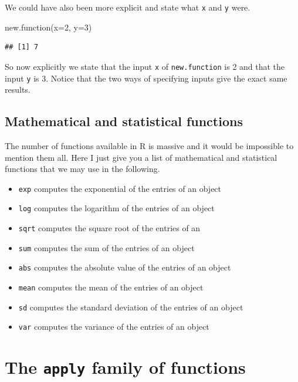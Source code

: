 \documentclass[
]{book}
\newenvironment{Shaded}{\begin{snugshade}}{\end{snugshade}}
\newcommand{\AttributeTok}[1]{\textcolor[rgb]{0.77,0.63,0.00}{#1}}
\newcommand{\DecValTok}[1]{\textcolor[rgb]{0.00,0.00,0.81}{#1}}
\newcommand{\FunctionTok}[1]{\textcolor[rgb]{0.00,0.00,0.00}{#1}}
\newcommand{\NormalTok}[1]{#1}
\begin{document}
We could have also been more explicit and state what \texttt{x} and \texttt{y} were.

\begin{Shaded}
\begin{Highlighting}[]
\FunctionTok{new.function}\NormalTok{(}\AttributeTok{x=}\DecValTok{2}\NormalTok{, }\AttributeTok{y=}\DecValTok{3}\NormalTok{)}
\end{Highlighting}
\end{Shaded}

\begin{verbatim}
## [1] 7
\end{verbatim}

So now explicitly we state that the input \texttt{x} of \texttt{new.function} is 2 and that the input \texttt{y} is 3. Notice that the two ways of specifying inputs give the exact same results.

\hypertarget{mathematical-and-statistical-functions}{%
\subsection{Mathematical and statistical functions}\label{mathematical-and-statistical-functions}}

The number of functions available in R is massive and it would be impossible to mention them all. Here I just give you a list of mathematical and statistical functions that we may use in the following.

\begin{itemize}
\item
  \texttt{exp} computes the exponential of the entries of an object
\item
  \texttt{log} computes the logarithm of the entries of an object
\item
  \texttt{sqrt} computes the square root of the entries of an
\item
  \texttt{sum} computes the sum of the entries of an object
\item
  \texttt{abs} computes the absolute value of the entries of an object
\item
  \texttt{mean} computes the mean of the entries of an object
\item
  \texttt{sd} computes the standard deviation of the entries of an object
\item
  \texttt{var} computes the variance of the entries of an object
\end{itemize}

\hypertarget{the-apply-family-of-functions}{%
\section{\texorpdfstring{The \texttt{apply} family of functions}{The apply family of functions}}\label{the-apply-family-of-functions}}
\end{document}
